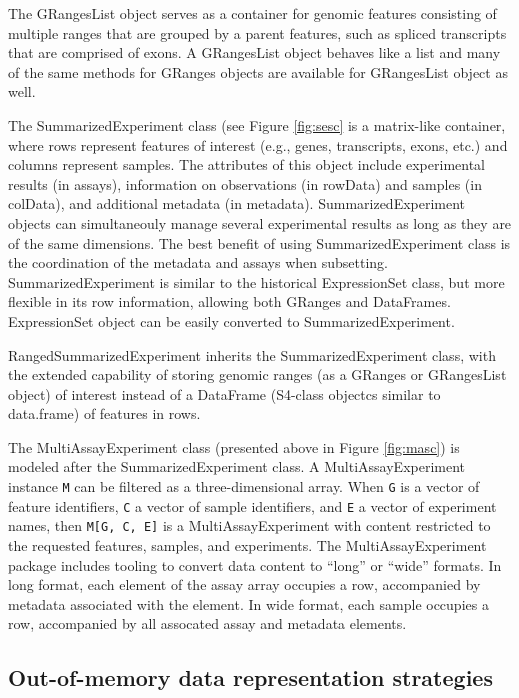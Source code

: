 The GRangesList object serves as a container for genomic features consisting of multiple
ranges that are grouped by a parent features, such as spliced transcripts that are
comprised of exons. A GRangesList object behaves like a list and many of the same
methods for GRanges objects are available for GRangesList object as well.

The SummarizedExperiment class (see Figure \ref{fig:sesc} is a matrix-like container, where rows represent features of interest (e.g., genes, transcripts, exons, etc.) and columns represent samples. The attributes of this object include experimental results (in assays), information on observations (in rowData) and samples (in colData), and additional metadata (in metadata). SummarizedExperiment objects can simultaneouly manage several experimental results as long as they are of the same dimensions. The best benefit of using SummarizedExperiment class is the coordination of the metadata and assays when subsetting. SummarizedExperiment is similar to the historical ExpressionSet class, but more flexible in its row information, allowing both GRanges and DataFrames. ExpressionSet object can be easily converted to SummarizedExperiment.

RangedSummarizedExperiment inherits the SummarizedExperiment class, with the extended capability of storing genomic ranges (as a GRanges or GRangesList object) of interest instead of a DataFrame (S4-class objectcs similar to data.frame) of features in rows.

The MultiAssayExperiment class (presented above in
Figure \ref{fig:masc}) is modeled after the SummarizedExperiment class.
A MultiAssayExperiment instance \texttt{M} can be
filtered as a three-dimensional array.
When \texttt{G} is a vector of feature identifiers,
\texttt{C} a vector of sample identifiers, and \texttt{E} a
vector of experiment names, then \texttt{M{[}G, C, E{]}} is
a MultiAssayExperiment with content restricted to the
requested features, samples, and experiments. The MultiAssayExperiment
package includes tooling to convert data content to ``long'' or
``wide'' formats. In long format, each element of the assay array occupies
a row, accompanied by metadata associated with the element.
In wide format, each sample occupies a row, accompanied by all
assocated assay and metadata elements.

\subsection{Out-of-memory data representation strategies}\label{out-of-memory-data-representation-strategies}

